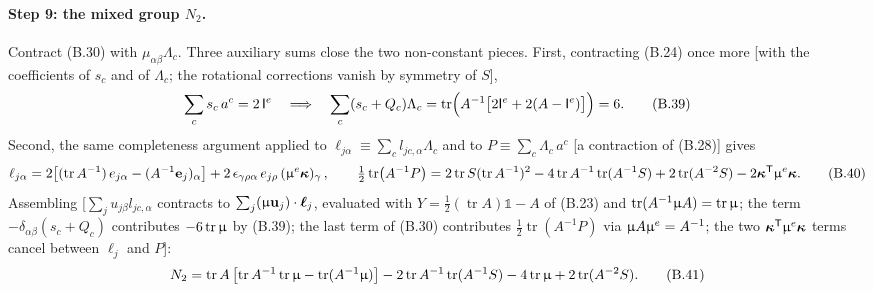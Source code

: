 \paragraph{Step 9: the mixed group $N_2$.}
Contract (B.30) with $\mu_{\alpha\beta}\Lambda_c$. Three auxiliary sums close the two non-constant pieces. First, contracting (B.24) once more [with the coefficients of $s_c$ and of $\Lambda_c$; the rotational corrections vanish by symmetry of $S$],
\begin{equation}
\sum_c s_c\,a^{c}=2\,\mathsf I^{e}
\quad\Longrightarrow\quad
\sum_c(s_c+Q_c)\Lambda_c
=\operatorname{tr}\Bigl(A^{-1}\bigl[2\mathsf I^{e}+2(A-\mathsf I^{e})\bigr]\Bigr)=6 . \tag{B.39}
\end{equation}
Second, the same completeness argument applied to $\ell_{j\alpha}\equiv\sum_cl_{jc,\alpha}\Lambda_c$ and to $P\equiv\sum_c\Lambda_c\,a^{c}$ [a contraction of (B.28)] gives
\begin{equation}
\ell_{j\alpha}=2\bigl[(\operatorname{tr}A^{-1})\,e_{j\alpha}-(A^{-1}\mathbf e_j)_{\alpha}\bigr]+2\,\epsilon_{\gamma\rho\alpha}\,e_{j\rho}\,(\upmu^{e}\boldsymbol\kappa)_{\gamma}\, ,
\qquad
\tfrac12\operatorname{tr}\bigl(A^{-1}P\bigr)
=2\operatorname{tr}S(\operatorname{tr}A^{-1})^{2}-4\operatorname{tr}A^{-1}\operatorname{tr}(A^{-1}S)+2\operatorname{tr}(A^{-2}S)-2\boldsymbol\kappa^{\mathsf T}\upmu^{e}\boldsymbol\kappa . \tag{B.40}
\end{equation}
Assembling [$\sum_ju_{j\beta}l_{jc,\alpha}$ contracts to $\sum_j(\upmu\mathbf u_j)\cdot\boldsymbol\ell_j$, evaluated with $Y=\tfrac12(\operatorname{tr}A)\mathbb 1-A$ of (B.23) and $\operatorname{tr}(A^{-1}\upmu A)=\operatorname{tr}\upmu$; the term $-\delta_{\alpha\beta}(s_c+Q_c)$ contributes $-6\operatorname{tr}\upmu$ by (B.39); the last term of (B.30) contributes $\tfrac12\operatorname{tr}(A^{-1}P)$ via $\upmu A\upmu^{e}=A^{-1}$; the two $\boldsymbol\kappa^{\mathsf T}\upmu^{e}\boldsymbol\kappa$ terms cancel between $\boldsymbol\ell_j$ and $P$]:
\begin{equation}
N_2=\operatorname{tr}A\,\bigl[\operatorname{tr}A^{-1}\operatorname{tr}\upmu-\operatorname{tr}(A^{-1}\upmu)\bigr]
-2\operatorname{tr}A^{-1}\operatorname{tr}(A^{-1}S)-4\operatorname{tr}\upmu+2\operatorname{tr}(A^{-2}S) . \tag{B.41}
\end{equation}

